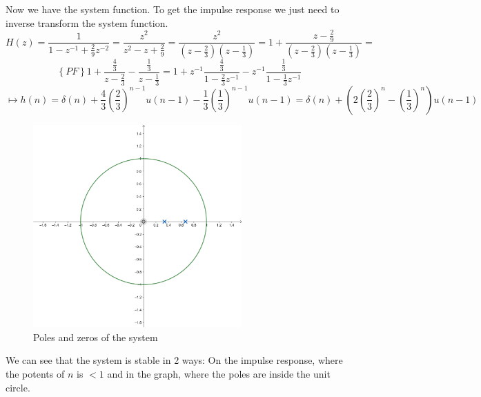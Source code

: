 \documentclass{article}
\begin{document}
\begin{enumerate}
\begin{enumerate}
                Now we have the system function. To get the impulse response we just need to inverse transform the system function.
                $$
                    H(z) = \frac{1}{1 - z^{-1} + \frac{2}{9}z^{-2}} = 
                    \frac{z^2}{z^2 - z + \frac{2}{9}} = 
                    \frac{z^2}{ (z-\frac{2}{3}) (z-\frac{1}{3}) } = 
                    1 + \frac{z-\frac{2}{9}}{ (z-\frac{2}{3}) (z-\frac{1}{3}) } =
                $$ $$
                    \left\{ PF \right\} 
                    1 + \frac{\frac{4}{3}}{z-\frac{2}{3}} - \frac{\frac{1}{3}}{z-\frac{1}{3}} = 
                    1 + z^{-1}\frac{\frac{4}{3}}{1-\frac{2}{3}z^{-1}}
                    - z^{-1}\frac{\frac{1}{3}}{1-\frac{1}{3}z^{-1}} 
                $$ $$
                    \longmapsto h(n) = \delta(n) + \frac{4}{3} \left( \frac{2}{3} \right)^{n-1}u(n-1)
                    - \frac{1}{3}\left( \frac{1}{3}\right)^{n-1}u(n-1) 
                    = \delta(n) + \left( 2 \left( \frac{2}{3} \right)^n
                    - \left( \frac{1}{3} \right)^n \right) u(n-1)
                $$
               	\begin{figure}[h]
               		\centering
               		\includegraphics[width=8.0cm]{geogebra-export.png}
               		\caption{Poles and zeros of the system}
               		\label{fig:plot1}
               	\end{figure}

                We can see that the system is stable in 2 ways: On the impulse
response, where the potents of $n$ is $<1$ and in the graph, where the poles
are inside the unit circle.
                
                
                

\end{enumerate}
\end{enumerate}
\end{document}
